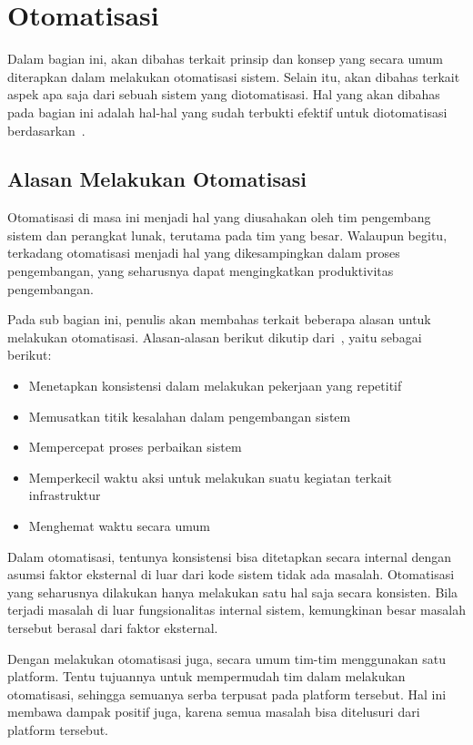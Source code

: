 \section{Otomatisasi}\label{automation}

Dalam bagian ini, akan dibahas terkait prinsip dan konsep yang secara umum diterapkan dalam melakukan otomatisasi sistem. Selain itu, akan dibahas terkait aspek apa saja dari sebuah sistem yang diotomatisasi. Hal yang akan dibahas pada bagian ini adalah hal-hal yang sudah terbukti efektif untuk diotomatisasi berdasarkan~\cite{beyer2016site}.

\subsection{Alasan Melakukan Otomatisasi}
Otomatisasi di masa ini menjadi hal yang diusahakan oleh tim pengembang sistem dan perangkat lunak, terutama pada tim yang besar. Walaupun begitu, terkadang otomatisasi menjadi hal yang dikesampingkan dalam proses pengembangan, yang seharusnya dapat mengingkatkan produktivitas pengembangan.

Pada sub bagian ini, penulis akan membahas terkait beberapa alasan untuk melakukan otomatisasi. Alasan-alasan berikut dikutip dari~\cite{beyer2016site}, yaitu sebagai berikut:

\begin{itemize}
  \item Menetapkan konsistensi dalam melakukan pekerjaan yang repetitif
  \item Memusatkan titik kesalahan dalam pengembangan sistem
  \item Mempercepat proses perbaikan sistem
  \item Memperkecil waktu aksi untuk melakukan suatu kegiatan terkait infrastruktur
  \item Menghemat waktu secara umum
\end{itemize}

Dalam otomatisasi, tentunya konsistensi bisa ditetapkan secara internal dengan asumsi faktor eksternal di luar dari kode sistem tidak ada masalah. Otomatisasi yang seharusnya dilakukan hanya melakukan satu hal saja secara konsisten. Bila terjadi masalah di luar fungsionalitas internal sistem, kemungkinan besar masalah tersebut berasal dari faktor eksternal.

Dengan melakukan otomatisasi juga, secara umum tim-tim menggunakan satu platform. Tentu tujuannya untuk mempermudah tim dalam melakukan otomatisasi, sehingga semuanya serba terpusat pada platform tersebut. Hal ini membawa dampak positif juga, karena semua masalah bisa ditelusuri dari platform tersebut.

